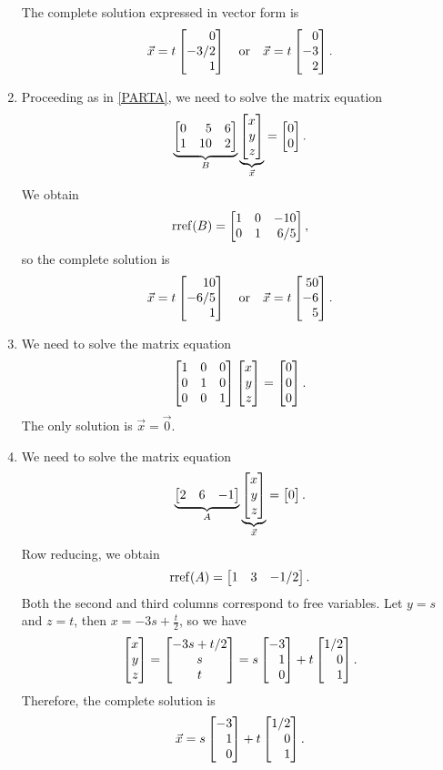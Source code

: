 \begin{exercises}
\begin{problist}
\begin{solution}
\begin{enumerate}
				The complete solution expressed in vector form is
				\[
					\vec x = t\mat{0\\-3/2\\1} \quad \text{or} \quad \vec x = t\mat{0\\-3\\2}.
				\]
				\item  Proceeding as in \ref{PARTA}, we need to solve the matrix equation
				\[
					\underbrace{\mat{0&5&6\\1&10&2} }_{B} \underbrace{\mat{x\\y\\z}}_{\vec{x}} = \mat{0\\0}.
				\]
				We obtain
				\[
					\rref (B) = \mat{1&0&-10\\0&1&6/5},
				\]
				so the complete solution is 
				\[
					\vec x = t\mat{10\\-6/5\\1} \quad \text{or} \quad \vec x = t\mat{50\\-6\\5}.
				\]


				\item We need to solve the matrix equation
				\[
					\mat{1&0&0\\0&1&0\\0&0&1} \mat{x\\y\\z} = \mat{0\\0\\0}.
				\]
				The only solution is $\vec x = \vec 0$.


				\item We need to solve the matrix equation
				\[
					\underbrace{\mat{2&6&-1} }_{A} \underbrace{\mat{x\\y\\z}}_{\vec x} = \mat{0}.
				\]
				Row reducing, we obtain
				\[
					\rref (A) = \mat{1&3&-1/2}.
				\]
				Both the second and third columns correspond to free variables. Let $y=s$ and $z=t$, then $x = -3s + \frac{t}{2}$, 
					so we have
				\[
					\mat{x\\y\\z} = \matc{-3s+t/2\\s\\t} = s\mat{-3\\1\\0} + t\mat{1/2\\0\\1}.
				\]
				Therefore, the complete solution is
				\[
					\vec x = s\mat{-3\\1\\0} + t\mat{1/2\\0\\1}.
				\]
			\end{enumerate}
		\end{solution}	


\end{problist}
\end{exercises}
